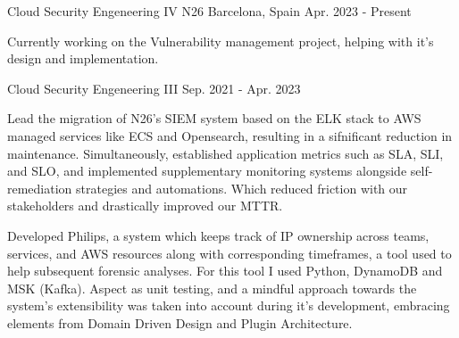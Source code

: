 
\begin{cventries}
	\cventry
	{Cloud Security Engeneering IV} %
	{N26} %
	{Barcelona, Spain} %
	{Apr. 2023 - Present} %
	{
		\begin{cvitems} %
			\item {Currently working on the Vulnerability management project, helping with it's design and implementation.}
		\end{cvitems}
	}

	\cventry
	{Cloud Security Engeneering III} %
	{} %
	{} %
	{Sep. 2021 - Apr. 2023} %
	{
		\begin{cvitems} %
			\item {Lead the migration of N26's SIEM system based on the ELK stack to AWS managed services like ECS and Opensearch, resulting in a sifnificant reduction in maintenance. Simultaneously, established application metrics such as SLA, SLI, and SLO, and implemented supplementary monitoring systems alongside self-remediation strategies and automations. Which reduced friction with our stakeholders and drastically improved our MTTR.}
			\item {Developed Philips, a system which keeps track of IP ownership across teams, services, and AWS resources along with corresponding timeframes, a tool used to help subsequent forensic analyses. For this tool I used Python, DynamoDB and MSK (Kafka). Aspect as unit testing, and a mindful approach towards the system's extensibility was taken into account during it's development, embracing elements from Domain Driven Design and Plugin Architecture.}
		\end{cvitems}
	}


\end{cventries}

